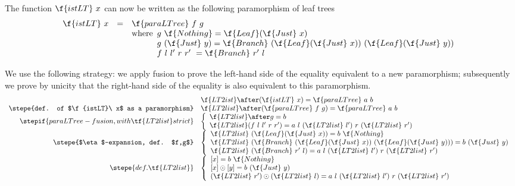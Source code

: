 \documentclass[a4paper,11pt]{llncs}
\begin{document}
The function $\f{istLT}\ x$ can now be written as the following
paramorphism of leaf trees
$$
\begin{array}{rcl}
  \f{istLT}\ x & = &\f{paraLTree}\ f\ g\\
  && \mbox{where} 
  \begin{array}[t]{l}
    g\ \f{Nothing} = \f{Leaf}(\f{Just}\ x)\\
    g\ (\f{Just}\ y) = \f{Branch}\ (\f{Leaf}(\f{Just}\ x))\
    (\f{Leaf}(\f{Just}\ y)) \\   
    f\ l\ l'\ r\ r'\ = \f{Branch}\ r'\ l\\
\end{array}\\
\end{array}
$$

We use the following strategy: we apply fusion to prove the left-hand
side of the equality equivalent to a new paramorphism; subsequently we
prove by unicity that the right-hand side of the equality is also
equivalent to this paramorphism.
$$
  \begin{array}{rl}
    & \f{LT2ist} \after (\f{istLT}\ x) = \f{paraLTree}\ a\ b\\
    \stepe{def. of $\f{istLT}\ x$ as a paramorphism}
    & \f{LT2list} \after (\f{paraLTree}\ f\ g)  = \f{paraLTree}\ a\
    b \\
\stepif{paraLTree-fusion, with \tf{LT2list}
      strict} 
    & \left \{ 
      \begin{array}{l}
        \f{LT2list} \after g = b \\
        \f{LT2list}(f\ l\ l'\ r\ r') = a\ l\ (\f{LT2list}\ l')\ r\
        (\f{LT2list}\ r')
      \end{array}
      \right .\\
      \stepe{$\eta$-expansion, def. $f,g$}
    & \left \{ 
      \begin{array}{l}
        \f{LT2list}\ (\f{Leaf}(\f{Just}\ x)) = b\ \f{Nothing}\\
        \f{LT2list}\ (\f{Branch}\ (\f{Leaf}(\f{Just}\
        x))\ (\f{Leaf}(\f{Just}\ y))) = b\ (\f{Just}\ y)\\
        \f{LT2list}\ (\f{Branch}\ r'\ l) = a\ l\
        (\f{LT2list}\ l')\ r\ (\f{LT2list}\ r')
      \end{array}
      \right .\\
    \stepe{def. \tf{LT2list}}
    & \left \{
    \begin{array}{l}
      [x] = b\ \f{Nothing} \\
      \protect[x]  \odot [y] = b\ (\f{Just}\ y)\\
      (\f{LT2list}\ r') \odot (\f{LT2list}\ l) = a\ l\
      (\f{LT2list}\ l')\ r\ (\f{LT2list}\ r')
    \end{array}
  \right .\\
\end{array}
$$
\end{document}
